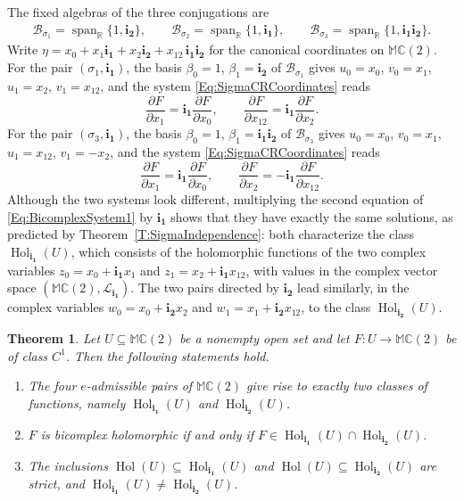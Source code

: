\documentclass[12pt]{amsart}
\theoremstyle{plain}
\newtheorem{theorem}{Theorem}[section]
\theoremstyle{definition}
\numberwithin{equation}{section}
\newcommand{\im}[1]{\mathbf{ i_{#1}}}
\newcommand{\mC}{\mathbb{C}}
\newcommand{\mR}{\mathbb{R}}
\newcommand{\mM}{\mathbb{M}}
\newcommand{\cL}{\mathcal{L}}
\newcommand{\cB}{\mathcal{B}}
\newcommand{\ra}{\rightarrow}
\DeclareMathOperator{\spn}{span}
\DeclareMathOperator{\hol}{Hol}
\begin{document}
The fixed algebras of the three conjugations are
    \begin{align*}
    \cB_{\sigma_1} = \spn_{\mR} \{ 1 , \im{2} \}, \qquad \cB_{\sigma_2} = \spn_{\mR} \{ 1 , \im{1} \}, \qquad \cB_{\sigma_3} = \spn_{\mR} \{ 1 , \im{1}\im{2} \}.
    \end{align*}
Write $\eta = x_0 + x_1 \im{1} + x_2 \im{2} + x_{12}\, \im{1}\im{2}$ for the canonical coordinates on $\mM \mC(2)$. For the pair $(\sigma_1 , \im{1})$, the basis $\beta_0 = 1$, $\beta_1 = \im{2}$ of $\cB_{\sigma_1}$ gives $u_0 = x_0$, $v_0 = x_1$, $u_1 = x_2$, $v_1 = x_{12}$, and the system \eqref{Eq:SigmaCRCoordinates} reads
    \begin{equation}\label{Eq:BicomplexSystem1}
    \frac{\partial F}{\partial x_1} = \im{1} \frac{\partial F}{\partial x_0} , \qquad \frac{\partial F}{\partial x_{12}} = \im{1} \frac{\partial F}{\partial x_2}.
    \end{equation}
For the pair $(\sigma_3 , \im{1})$, the basis $\beta_0 = 1$, $\beta_1 = \im{1}\im{2}$ of $\cB_{\sigma_3}$ gives $u_0 = x_0$, $v_0 = x_1$, $u_1 = x_{12}$, $v_1 = - x_2$, and the system \eqref{Eq:SigmaCRCoordinates} reads
    \begin{equation}\label{Eq:BicomplexSystem3}
    \frac{\partial F}{\partial x_1} = \im{1} \frac{\partial F}{\partial x_0} , \qquad \frac{\partial F}{\partial x_{2}} = -\im{1} \frac{\partial F}{\partial x_{12}}.
    \end{equation}
Although the two systems look different, multiplying the second equation of \eqref{Eq:BicomplexSystem1} by $\im{1}$ shows that they have exactly the same solutions, as predicted by Theorem~\ref{T:SigmaIndependence}: both characterize the class $\hol_{\im{1}} (U)$, which consists of the holomorphic functions of the two complex variables $z_0 = x_0 + \im{1} x_1$ and $z_1 = x_2 + \im{1} x_{12}$, with values in the complex vector space $(\mM \mC(2) , \cL_{\im{1}})$. The two pairs directed by $\im{2}$ lead similarly, in the complex variables $w_0 = x_0 + \im{2} x_2$ and $w_1 = x_1 + \im{2} x_{12}$, to the class $\hol_{\im{2}} (U)$.

    \begin{theorem}\label{T:BicomplexComplete}
    Let $U \subseteq \mM \mC(2)$ be a nonempty open set and let $F : U \ra \mM \mC(2)$ be of class $C^1$. Then the following statements hold.
        \begin{enumerate}[label=(\alph*)]
        \item The four $e$-admissible pairs of $\mM \mC(2)$ give rise to exactly two classes of functions, namely $\hol_{\im{1}} (U)$ and $\hol_{\im{2}} (U)$.
        \item $F$ is bicomplex holomorphic if and only if $F \in \hol_{\im{1}} (U) \cap \hol_{\im{2}} (U)$.
        \item The inclusions $\hol(U) \subseteq \hol_{\im{1}} (U)$ and $\hol(U) \subseteq \hol_{\im{2}} (U)$ are strict, and $\hol_{\im{1}} (U) \neq \hol_{\im{2}} (U)$.
        \end{enumerate}
    \end{theorem}
\end{document}
